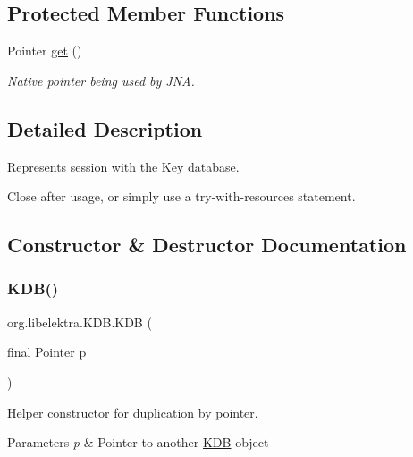 \subsection*{Protected Member Functions}
\begin{DoxyCompactItemize}
\item 
Pointer \hyperlink{classorg_1_1libelektra_1_1KDB_a600abc786bde91a3122bd96be991a3d5}{get} ()
\begin{DoxyCompactList}\small\item\em Native pointer being used by J\+NA. \end{DoxyCompactList}\end{DoxyCompactItemize}


\subsection{Detailed Description}
Represents session with the \hyperlink{classorg_1_1libelektra_1_1Key}{Key} database. 

Close after usage, or simply use a try-\/with-\/resources statement. 

\subsection{Constructor \& Destructor Documentation}
\mbox{\label{classorg_1_1libelektra_1_1KDB_a256255ad383403a2efe699c4ccc4fe12}} 
\subsubsection{\texorpdfstring{K\+D\+B()}{KDB()}}
{\footnotesize\ttfamily org.\+libelektra.\+K\+D\+B.\+K\+DB (\begin{DoxyParamCaption}\item[{final Pointer}]{p }\end{DoxyParamCaption})\hspace{0.3cm}{\ttfamily [inline]}}



Helper constructor for duplication by pointer. 


\begin{DoxyParams}{Parameters}
{\em p} & Pointer to another \hyperlink{classorg_1_1libelektra_1_1KDB}{K\+DB} object \\
\hline
\end{DoxyParams}


